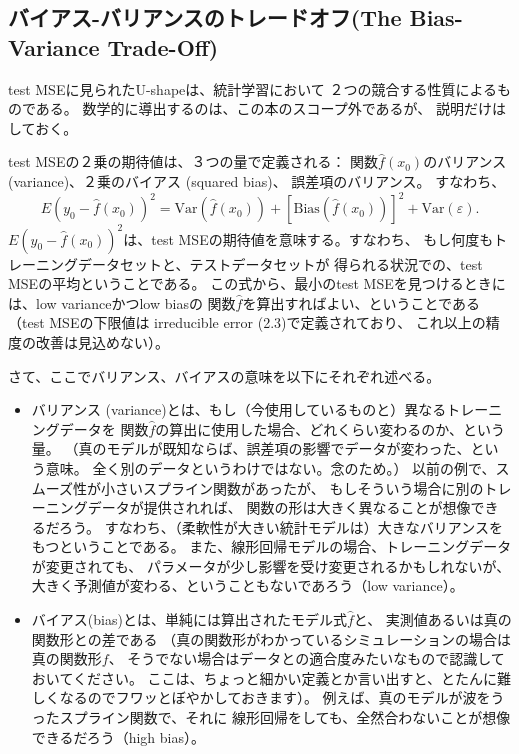 \documentclass{jsbook}
\begin{document}
\subsection{バイアス-バリアンスのトレードオフ(The Bias-Variance Trade-Off)}
test MSEに見られたU-shapeは、統計学習において
２つの競合する性質によるものである。
数学的に導出するのは、この本のスコープ外であるが、
説明だけはしておく。

test MSEの２乗の期待値は、３つの量で定義される：
関数$\hat{f}(x_0)$のバリアンス (variance)、２乗のバイアス (squared bias)、
誤差項のバリアンス。
すなわち、
\begin{equation}
	E(y_0 - \hat{f}(x_0))^2 = \text{Var}(\hat{f}(x_0)) + [\text{Bias}(\hat{f}(x_0))]^2 + \text{Var}(\varepsilon).
\end{equation}
$E(y_0 - \hat{f}(x_0))^2$は、test MSEの期待値を意味する。すなわち、
もし何度もトレーニングデータセットと、テストデータセットが
得られる状況での、test MSEの平均ということである。
この式から、最小のtest MSEを見つけるときには、low varianceかつlow biasの
関数$\hat{f}$を算出すればよい、ということである（test MSEの下限値は irreducible error (2.3)で定義されており、
これ以上の精度の改善は見込めない）。

さて、ここでバリアンス、バイアスの意味を以下にそれぞれ述べる。
\begin{itemize}
\item バリアンス (variance)とは、もし（今使用しているものと）異なるトレーニングデータを
関数$\hat{f}$の算出に使用した場合、どれくらい変わるのか、という量。
（真のモデルが既知ならば、誤差項の影響でデータが変わった、という意味。
全く別のデータというわけではない。念のため。）
以前の例で、スムーズ性が小さいスプライン関数があったが、
もしそういう場合に別のトレーニングデータが提供されれば、
関数の形は大きく異なることが想像できるだろう。
すなわち、（柔軟性が大きい統計モデルは）大きなバリアンスをもつということである。
また、線形回帰モデルの場合、トレーニングデータが変更されても、
パラメータが少し影響を受け変更されるかもしれないが、
大きく予測値が変わる、ということもないであろう（low variance）。
\item バイアス(bias)とは、単純には算出されたモデル式$\hat{f}$と、
実測値あるいは真の関数形との差である
（真の関数形がわかっているシミュレーションの場合は真の関数形$f$、
そうでない場合はデータとの適合度みたいなもので認識しておいてください。
ここは、ちょっと細かい定義とか言い出すと、とたんに難しくなるのでフワッとぼやかしておきます）。
例えば、真のモデルが波をうったスプライン関数で、それに
線形回帰をしても、全然合わないことが想像できるだろう（high bias）。
\end{itemize}
\end{document}
